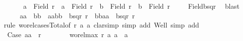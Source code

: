 \begin{isabellebody}
\ \ \ \isamarkupfalse%
\ {}{\isacharcolon}{\kern0pt}\ {\isachardoublequoteopen}a{}\ {\isasymin}\ Field\ r\ {\isasymand}\ a{}\ {\isasymin}\ Field\ r\ {\isasymand}\ b{}\ {\isasymin}\ Field\ r\ {\isasymand}\ b{}\ {\isasymin}\ Field\ r{\isachardoublequoteclose}\isanewline
\ \ \ \isamarkupfalse%
\ Field{\isacharunderscore}{\kern0pt}bsqr\ \isamarkupfalse%
\ blast\isanewline
\ \ \ \isamarkupfalse%
\ {\isachardoublequoteopen}{\isacharparenleft}{\kern0pt}{\isacharparenleft}{\kern0pt}a{}{\isacharcomma}{\kern0pt}a{}{\isacharparenright}{\kern0pt}\ {\isacharequal}{\kern0pt}\ {\isacharparenleft}{\kern0pt}b{}{\isacharcomma}{\kern0pt}b{}{\isacharparenright}{\kern0pt}\ {\isasymor}\ {\isacharparenleft}{\kern0pt}{\isacharparenleft}{\kern0pt}a{}{\isacharcomma}{\kern0pt}a{}{\isacharparenright}{\kern0pt}{\isacharcomma}{\kern0pt}{\isacharparenleft}{\kern0pt}b{}{\isacharcomma}{\kern0pt}b{}{\isacharparenright}{\kern0pt}{\isacharparenright}{\kern0pt}\ {\isasymin}\ bsqr\ r\ {\isasymor}\ {\isacharparenleft}{\kern0pt}{\isacharparenleft}{\kern0pt}b{}{\isacharcomma}{\kern0pt}b{}{\isacharparenright}{\kern0pt}{\isacharcomma}{\kern0pt}{\isacharparenleft}{\kern0pt}a{}{\isacharcomma}{\kern0pt}a{}{\isacharparenright}{\kern0pt}{\isacharparenright}{\kern0pt}\ {\isasymin}\ bsqr\ r{\isacharparenright}{\kern0pt}{\isachardoublequoteclose}\isanewline
\ \ \ \isamarkupfalse%
{\isacharparenleft}{\kern0pt}rule\ wo{\isacharunderscore}{\kern0pt}rel{\isachardot}{\kern0pt}cases{\isacharunderscore}{\kern0pt}Total{\isacharbrackleft}{\kern0pt}of\ r\ a{}\ a{}{\isacharbrackright}{\kern0pt}{\isacharcomma}{\kern0pt}\ clarsimp\ simp\ add{\isacharcolon}{\kern0pt}\ Well{\isacharcomma}{\kern0pt}\ simp\ add{\isacharcolon}{\kern0pt}\ {}{\isacharparenright}{\kern0pt}\isanewline
\ \ \ \ \ \ \ \isanewline
\ \ \ \ \ \isamarkupfalse%
\ Case{}{\isacharcolon}{\kern0pt}\ {\isachardoublequoteopen}{\isacharparenleft}{\kern0pt}a{}{\isacharcomma}{\kern0pt}a{}{\isacharparenright}{\kern0pt}\ {\isasymin}\ r{\isachardoublequoteclose}\isanewline
\ \ \ \ \ \isamarkupfalse%
\ {}{\isacharcolon}{\kern0pt}\ {\isachardoublequoteopen}wo{\isacharunderscore}{\kern0pt}rel{\isachardot}{\kern0pt}max{}\ r\ a{}\ a{}\ {\isacharequal}{\kern0pt}\ a{}{\isachardoublequoteclose}\isanewline

\end{isabellebody}
